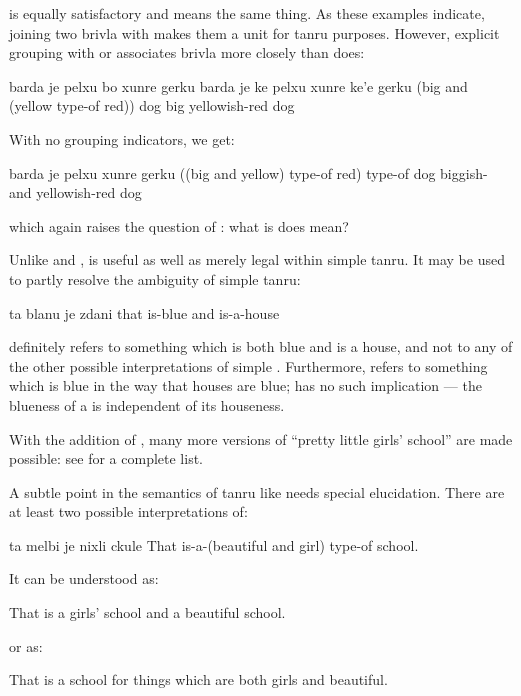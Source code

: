 {\noindent}is equally satisfactory and means the same thing. As these
    examples indicate, joining two brivla with  makes them a
    unit for tanru purposes. However, explicit grouping with 
    or  associates brivla more closely than 
    does:
\begin{example}
barda je pelxu bo xunre gerku\n
barda je ke pelxu xunre ke'e gerku\n
(big and (yellow type-of red)) dog\n
big yellowish-red dog
\end{example}

With no grouping indicators, we get:
\begin{example}
barda je pelxu xunre gerku\n
((big and yellow) type-of red) type-of dog\n
biggish- and yellowish-red dog
\end{example}

{\noindent}which again raises the question of : what is does  mean? 

Unlike  and ,  is useful as well
    as merely legal within simple tanru. It may be used to partly
    resolve the ambiguity of simple tanru:
\begin{example}
ta blanu je zdani\n
that is-blue and is-a-house
\end{example}

{\noindent}definitely refers to something which is both blue and is a
    house, and not to any of the other possible interpretations of
    simple . Furthermore,  refers to
    something which is blue in the way that houses are blue;
     has no such implication --- the blueness of
    a  is independent of its houseness. 

With the addition of , many more versions of ``pretty
    little girls' school'' are made possible: see  for a complete list.

A subtle point in the semantics of tanru like  needs special elucidation. There
    are at least two possible interpretations of:
\begin{example}
ta melbi je nixli ckule\n
That is-a-(beautiful and girl) type-of school.
\end{example}

It can be understood as:
\begin{example}
That is a girls' school and a beautiful school.
\end{example}

{\noindent}or as:
\begin{example}
That is a school for things\n
\T	which are both girls and beautiful.
\end{example}

